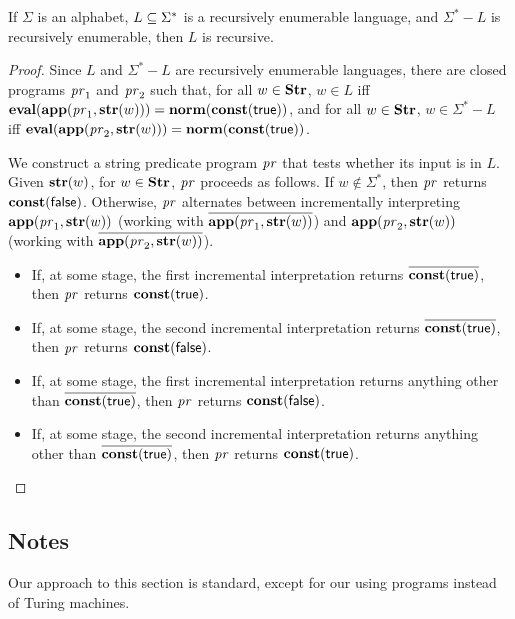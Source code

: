 \begin{theorem}
If $\Sigma$ is an alphabet, $L\subseteq\Sigma^*$ is a recursively
enumerable language, and $\Sigma^*-L$ is recursively enumerable, then
$L$ is recursive.
\end{theorem}

\begin{proof}
Since $L$ and $\Sigma^*-L$ are recursively enumerable languages,
there are closed programs $\mathit{pr}_1$ and $\mathit{pr}_2$ such that, for all $w\in\mathbf{Str}$,
$w\in L$ iff
$\mathbf{eval}(\mathbf{app}(\mathit{pr}_1,\mathbf{str}(w)))=\mathbf{norm}(\mathbf{const}(\mathsf{true}))$, and
for all $w\in\mathbf{Str}$, $w\in\Sigma^*-L$ iff
$\mathbf{eval}(\mathbf{app}(\mathit{pr}_2,\mathbf{str}(w)))=\mathbf{norm}(\mathbf{const}(\mathsf{true}))$.

We construct a string predicate program $\mathit{pr}$ that tests whether its
input is in $L$.  Given $\mathbf{str}(w)$, for $w\in\mathbf{Str}$, $\mathit{pr}$ proceeds
as follows.  If $w\not\in\Sigma^*$, then $\mathit{pr}$ returns
$\mathbf{const}(\mathsf{false})$.  Otherwise, $\mathit{pr}$ alternates between
incrementally interpreting $\mathbf{app}(\mathit{pr}_1,\mathbf{str}(w))$ (working with
$\overline{\mathbf{app}(\mathit{pr}_1,\mathbf{str}(w))}$) and
$\mathbf{app}(\mathit{pr}_2,\mathbf{str}(w))$ (working with
$\overline{\mathbf{app}(\mathit{pr}_2,\mathbf{str}(w))}$).

\begin{itemize}
\item If, at some stage, the first incremental interpretation returns
  $\overline{\mathbf{const}(\mathsf{true})}$, then $\mathit{pr}$ returns
  $\mathbf{const}(\mathsf{true})$.

\item If, at some stage, the second incremental interpretation returns
  $\overline{\mathbf{const}(\mathsf{true})}$, then $\mathit{pr}$ returns
  $\mathbf{const}(\mathsf{false})$.

\item If, at some stage, the first incremental interpretation returns
  anything other than $\overline{\mathbf{const}(\mathsf{true})}$, then $\mathit{pr}$
  returns $\mathbf{const}(\mathsf{false})$.

\item If, at some stage, the second incremental interpretation returns
  anything other than $\overline{\mathbf{const}(\mathsf{true})}$, then $\mathit{pr}$
  returns $\mathbf{const}(\mathsf{true})$.
\end{itemize}
\end{proof}

\subsection{Notes}

Our approach to this section is standard, except for our using
programs instead of Turing machines.

